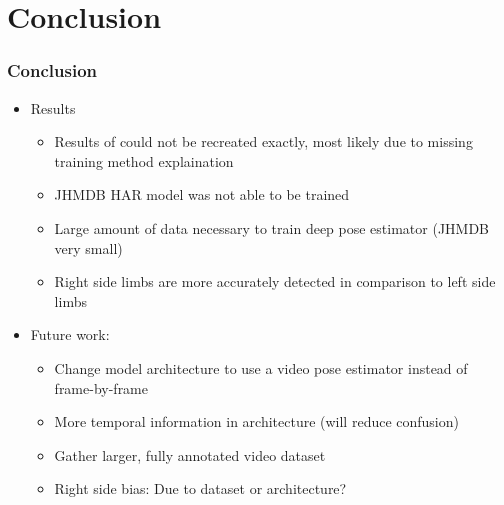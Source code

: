 \documentclass[9pt]{beamer}
\newenvironment{myframe}[1][]{%
\begin{frame}%
\frametitle{#1}
\setcounter{footnote}{0}


}{%
\end{frame}%
}
\begin{document}
\section{Conclusion}
\begin{myframe}[Conclusion]
    \begin{itemize}
        \item Results
        \begin{itemize}
            \item Results of \footnotemark[1] could not be recreated exactly, most likely due to missing training method explaination
            \item JHMDB HAR model was not able to be trained
            \item Large amount of data necessary to train deep pose estimator (JHMDB very small)
            \item Right side limbs are more accurately detected in comparison to left side limbs
        \end{itemize}
        \item Future work:
        \begin{itemize}
            \item Change model architecture to use a video pose estimator instead of frame-by-frame
            \item More temporal information in architecture (will reduce confusion)
            \item Gather larger, fully annotated video dataset
            \item Right side bias: Due to dataset or architecture?
        \end{itemize}            
    \end{itemize}

\end{myframe}
\end{document}
